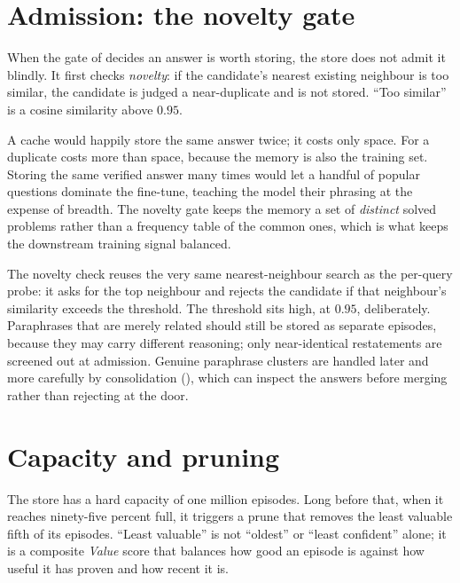 \section{Admission: the novelty gate}
\label{sec:memory-novelty}

When the gate of  decides an answer is worth storing, the store
does not admit it blindly. It first checks \emph{novelty}: if the candidate's nearest
existing neighbour is too similar, the candidate is judged a near-duplicate and is not
stored. ``Too similar'' is a cosine similarity above $0.95$.

\begin{intuition}
A cache would happily store the same answer twice; it costs only space. For \caem{}
a duplicate costs more than space, because the memory is also the training set. Storing
the same verified answer many times would let a handful of popular questions dominate
the fine-tune, teaching the model their phrasing at the expense of breadth. The novelty
gate keeps the memory a set of \emph{distinct} solved problems rather than a frequency
table of the common ones, which is what keeps the downstream training signal balanced.
\end{intuition}

The novelty check reuses the very same nearest-neighbour search as the per-query probe:
it asks for the top neighbour and rejects the candidate if that neighbour's similarity
exceeds the threshold. The threshold sits high, at $0.95$, deliberately. Paraphrases
that are merely related should still be stored as separate episodes, because they may
carry different reasoning; only near-identical restatements are screened out at
admission. Genuine paraphrase clusters are handled later and more carefully by
consolidation (), which can inspect the answers before
merging rather than rejecting at the door.

\section{Capacity and pruning}
\label{sec:memory-pruning}

The store has a hard capacity of one million episodes. Long before that, when it
reaches ninety-five percent full, it triggers a prune that removes the least valuable
fifth of its episodes. ``Least valuable'' is not ``oldest'' or ``least confident''
alone; it is a composite \emph{Value} score that balances how good an episode is
against how useful it has proven and how recent it is.

